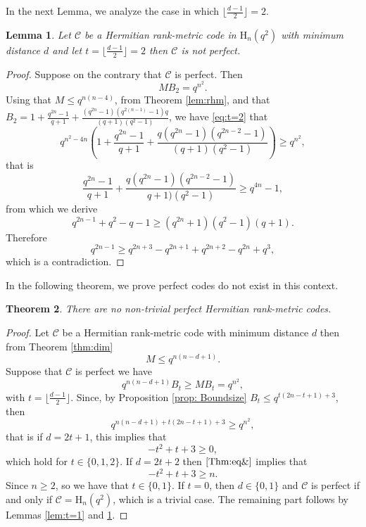 \documentclass[12pt,a4paper]{article}
\newtheorem{theorem}{Theorem}[section]
\newtheorem{lemma}[theorem]{Lemma}
\begin{document}
In the next Lemma, we analyze the case in which $\lfloor \frac{d-1}{2}\rfloor=2$.
 \begin{lemma}\label{lem:t=2}
    Let $\mathscr{C}$ be a Hermitian rank-metric code in $\mathrm{H}_n(q^2)$ with minimum distance $d$ and let $t=\lfloor\frac{d-1}{2}\rfloor=2$ then $\mathscr{C}$ is not perfect.
\end{lemma}
\begin{proof}
    Suppose on the contrary that $\mathscr{C}$ is perfect. Then 
    \begin{equation}\label{eq:t=2}
        MB_{2}=q^{n^2}.
    \end{equation}
    Using that $M\leq q^{n(n-4)}$, from Theorem \ref{lem:rhm}, and that $B_2=1+\frac{q^{2n}-1}{q+1}+\frac{(q^{2n}-1)(q^{2(n-1)}-1)q}{(q+1)(q^2-1)}$, we have \eqref{eq:t=2} that 
    \[q^{n^2-4n}\left(1+\frac{q^{2n}-1}{q+1}+\frac{q(q^{2n}-1)(q^{2n-2}-1)}{(q+1)(q^2-1)}\right)\geq q^{n^2},\]
    that is
    \[\frac{q^{2n}-1}{q+1}+\frac{q(q^{2n}-1)(q^{2n-2}-1)}{q+1)(q^2-1)}\geq q^{4n}-1,\]
  from which we derive
    \[q^{2n-1}+q^2-q-1\geq (q^{2n}+1)(q^2-1)(q+1).\]
      Therefore
    \[q^{2n-1}\geq  q^{2n+3}-q^{2n+1}+q^{2n+2}-q^{2n}+q^3,\] 
    which is a contradiction. 
 
\end{proof}
In the following theorem, we prove perfect codes do not exist in this context.
\begin{theorem}\label{main; thm}
There are no non-trivial perfect Hermitian rank-metric codes.
\end{theorem}
\begin{proof}
   Let $\mathscr{C}$ be a Hermitian rank-metric code with minimum distance $d$ then from Theorem \ref{thm:dim}
    \[{M\leq q^{n(n-d+1)}}.\] Suppose that $\mathscr{C}$ is perfect we have \[q^{n(n-d+1)}B_t\geq MB_t= q^{n^2},\] with $t=\lfloor \frac{d-1}{2}\rfloor$.
        Since, by Proposition \ref{prop: Boundsize} $B_t\leq q^{t(2n-t+1)+3}$, then 
        \begin{equation}\label{Thm:eq&}
           q^{n(n-d+1)+t(2n-t+1)+3}\geq q^{n^2},  
        \end{equation}
        that is 
if $d=2t+1$, this implies that
\[-t^2+t+3\geq 0,\]
which hold for $t\in\{0,1,2\}$.
If $d=2t+2$  then $\eqref{Thm:eq&}$ implies that 
\[-t^2+t+3\geq n.\]
Since $n\geq 2$, so we have that $t\in\{0,1\}$. If $t=0$, then $d\in\{0,1\}$ and $\mathscr{C}$ is perfect if and only if $\mathscr{C}= \mathrm{H}_n(q^2)$, which is a trivial case. The remaining part follows by Lemmas \ref{lem:t=1} and \ref{lem:t=2}.
\end{proof}
 
\end{document}
